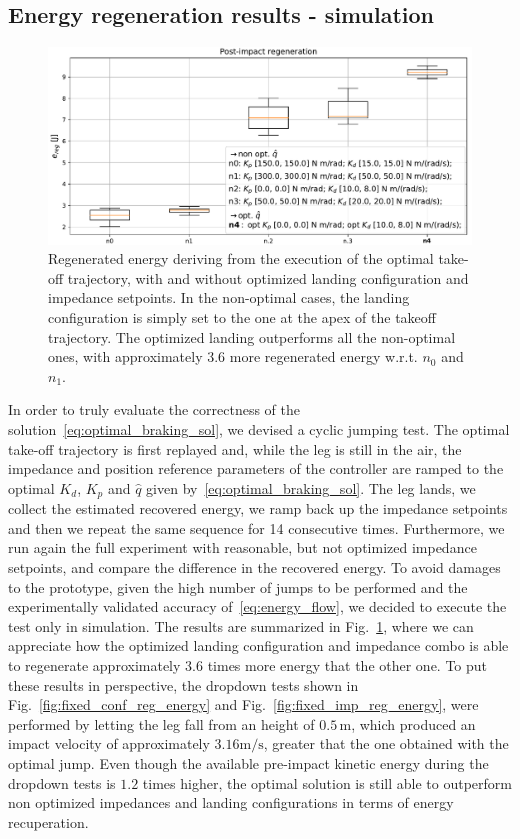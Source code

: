 \subsection{Energy regeneration results - simulation}
\begin{figure}[t]
    \centering
    \includegraphics[width=1\columnwidth]{images/opt_vs_non_opt_conf.pdf}
    \caption{Regenerated energy deriving from the execution of the optimal take-off trajectory, with and without optimized landing configuration and impedance setpoints. In the non-optimal cases, the landing configuration is simply set to the one at the apex of the takeoff trajectory. The optimized landing outperforms all the non-optimal ones, with approximately 3.6 more regenerated energy w.r.t. $n_0$ and $n_1$.}
    \label{fig:energy_rec_comp}
\end{figure}
In order to truly evaluate the correctness of the solution~\eqref{eq:optimal_braking_sol}, we devised a cyclic jumping test. The optimal take-off trajectory is first replayed and, while the leg is still in the air, the impedance and position reference parameters of the controller are ramped to the optimal $K_d$, $K_p$ and $\hat{q}$ given by~\eqref{eq:optimal_braking_sol}. The leg lands, we collect the estimated recovered energy, we ramp back up the impedance setpoints and then we repeat the same sequence for 14 consecutive times. Furthermore, we run again the full experiment with reasonable, but not optimized impedance setpoints, and compare the difference in the recovered energy. To avoid damages to the prototype, given the high number of jumps to be performed and the experimentally validated accuracy of~\eqref{eq:energy_flow}, we decided to execute the test only in simulation. The results are summarized in Fig.~\ref{fig:energy_rec_comp}, where we can appreciate how the optimized landing configuration and impedance combo is able to regenerate approximately $3.6$ times more energy that the other one. To put these results in perspective, the dropdown tests shown in Fig.~\ref{fig:fixed_conf_reg_energy} and Fig.~\ref{fig:fixed_imp_reg_energy}, were performed by letting the leg fall from an height of $0.5\,\mathrm{m}$, which produced an impact velocity of approximately $3.16\mathrm{m/s}$, greater that the one obtained with the optimal jump. Even though the available pre-impact kinetic energy during the dropdown tests is $1.2$ times higher, the optimal solution is still able to  outperform non optimized impedances and landing configurations in terms of energy recuperation.